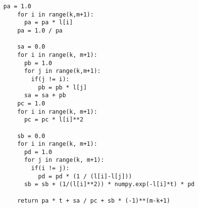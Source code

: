 \begin{lstlisting}[style=sPython,caption={Decay Equation Code in Python3}]
    pa = 1.0
    for i in range(k,m+1):
      pa = pa * l[i]
    pa = 1.0 / pa

    sa = 0.0
    for i in range(k, m+1):
      pb = 1.0
      for j in range(k,m+1):
        if(j != i):
          pb = pb * l[j]
      sa = sa + pb
    pc = 1.0 
    for i in range(k, m+1):
      pc = pc * l[i]**2

    sb = 0.0
    for i in range(k, m+1):
      pd = 1.0
      for j in range(k, m+1):
        if(i != j):
          pd = pd * (1 / (l[i]-l[j]))
      sb = sb + (1/(l[i]**2)) * numpy.exp(-l[i]*t) * pd

    return pa * t + sa / pc + sb * (-1)**(m-k+1)  
\end{lstlisting}



